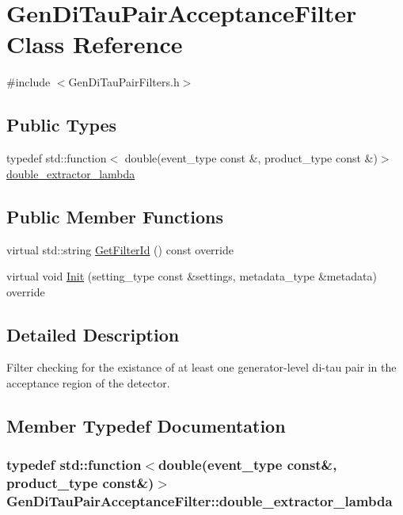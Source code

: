\hypertarget{classGenDiTauPairAcceptanceFilter}{
\section{GenDiTauPairAcceptanceFilter Class Reference}
\label{classGenDiTauPairAcceptanceFilter}
}


{\ttfamily \#include $<$GenDiTauPairFilters.h$>$}\subsection*{Public Types}
\begin{DoxyCompactItemize}
\item 
typedef std::function$<$ double(event\_\-type const \&, product\_\-type const \&)$>$ \hyperlink{classGenDiTauPairAcceptanceFilter_a3cf5cba7d06392dcb2c288b0ff2ef20c}{double\_\-extractor\_\-lambda}
\end{DoxyCompactItemize}
\subsection*{Public Member Functions}
\begin{DoxyCompactItemize}
\item 
virtual std::string \hyperlink{classGenDiTauPairAcceptanceFilter_aa071d779af14ccf823fbcc3bdb4e9041}{GetFilterId} () const override
\item 
virtual void \hyperlink{classGenDiTauPairAcceptanceFilter_a2dcca8c74d6c4734695166a993f74da4}{Init} (setting\_\-type const \&settings, metadata\_\-type \&metadata) override
\end{DoxyCompactItemize}


\subsection{Detailed Description}
Filter checking for the existance of at least one generator-\/level di-\/tau pair in the acceptance region of the detector. 

\subsection{Member Typedef Documentation}
\hypertarget{classGenDiTauPairAcceptanceFilter_a3cf5cba7d06392dcb2c288b0ff2ef20c}{
\subsubsection[{double\_\-extractor\_\-lambda}]{\setlength{\rightskip}{0pt plus 5cm}typedef std::function$<$double(event\_\-type const\&, product\_\-type const\&)$>$ {\bf GenDiTauPairAcceptanceFilter::double\_\-extractor\_\-lambda}}}
\label{classGenDiTauPairAcceptanceFilter_a3cf5cba7d06392dcb2c288b0ff2ef20c}


